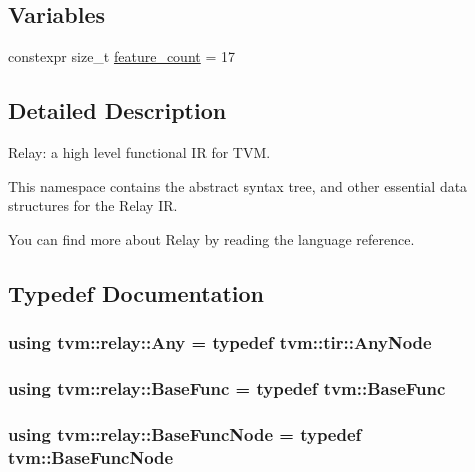 \subsection*{Variables}
\begin{DoxyCompactItemize}
\item 
constexpr size\+\_\+t \hyperlink{namespacetvm_1_1relay_ac3a576d7d192ce78bafb169c9aa882d1}{feature\+\_\+count} = 17
\end{DoxyCompactItemize}


\subsection{Detailed Description}
Relay\+: a high level functional IR for T\+VM. 

This namespace contains the abstract syntax tree, and other essential data structures for the Relay IR.

You can find more about Relay by reading the language reference. 

\subsection{Typedef Documentation}
\subsubsection[{\texorpdfstring{Any}{Any}}]{\setlength{\rightskip}{0pt plus 5cm}using {\bf tvm\+::relay\+::\+Any} = typedef {\bf tvm\+::tir\+::\+Any\+Node}}\hypertarget{namespacetvm_1_1relay_aa6b4b16b28a3cfd5052b2b4214a440d9}{}\label{namespacetvm_1_1relay_aa6b4b16b28a3cfd5052b2b4214a440d9}
\subsubsection[{\texorpdfstring{Base\+Func}{BaseFunc}}]{\setlength{\rightskip}{0pt plus 5cm}using {\bf tvm\+::relay\+::\+Base\+Func} = typedef {\bf tvm\+::\+Base\+Func}}\hypertarget{namespacetvm_1_1relay_acbaff2ae7feec23fea55e025a9cc1b76}{}\label{namespacetvm_1_1relay_acbaff2ae7feec23fea55e025a9cc1b76}
\subsubsection[{\texorpdfstring{Base\+Func\+Node}{BaseFuncNode}}]{\setlength{\rightskip}{0pt plus 5cm}using {\bf tvm\+::relay\+::\+Base\+Func\+Node} = typedef {\bf tvm\+::\+Base\+Func\+Node}}\hypertarget{namespacetvm_1_1relay_a4edf28d1226abc08d28bc2fd90ce7b42}{}\label{namespacetvm_1_1relay_a4edf28d1226abc08d28bc2fd90ce7b42}
